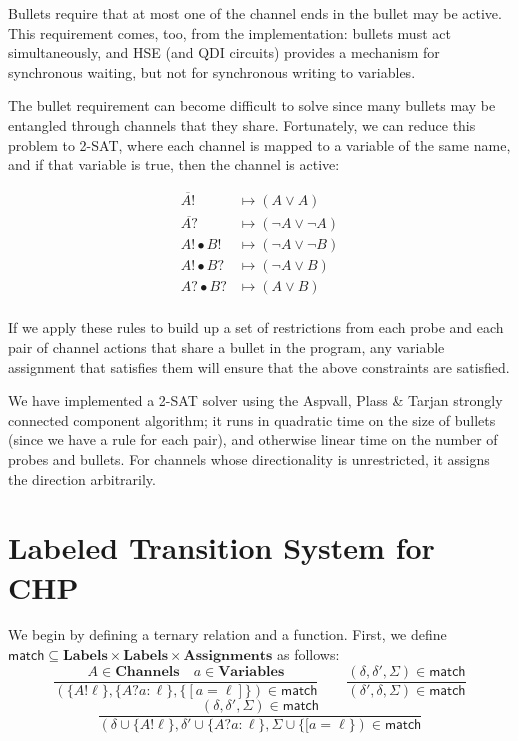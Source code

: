 \documentclass[times, 10pt]{article}
\begin{document}
Bullets require that at most one of the channel ends in the bullet may be
active.  This requirement comes, too, from the implementation:  bullets must act
simultaneously, and HSE (and QDI circuits) provides a mechanism for synchronous
waiting, but not for synchronous writing to variables.

The bullet requirement can become difficult to solve since many bullets may be
entangled through channels that they share.  Fortunately, we can reduce this
problem to 2-SAT, where each channel is mapped to a variable of the same name,
and if that variable is true, then the channel is active:

\begin{align*}
\overline{A!} & \mapsto (A \lor A) \\
\overline{A?} & \mapsto (\lnot A \lor \lnot A) \\
A! \bullet B! & \mapsto (\lnot A \lor \lnot B) \\
A! \bullet B? & \mapsto (\lnot A \lor B) \\
A? \bullet B? & \mapsto (A \lor B) \\
\end{align*}

If we apply these rules to build up a set of restrictions from each probe and
each pair of channel actions that share a bullet in the program, any variable
assignment that satisfies them will ensure that the above constraints are
satisfied.

We have implemented a 2-SAT solver using the Aspvall, Plass \& Tarjan strongly
connected component algorithm; it runs in quadratic time on the size of bullets
(since we have a rule for each pair), and otherwise linear time on the number of
probes and bullets.  For channels whose directionality is unrestricted, it
assigns the direction arbitrarily.

\section{Labeled Transition System for CHP}
We begin by defining a ternary relation and a function. First, we define
$\mathsf{match} \subseteq \mathbf{Labels} \times \mathbf{Labels} \times
\mathbf{Assignments}$ as follows:
$$
    \frac{A \in \mathbf{Channels} \quad a \in \mathbf{Variables}}{(\{A!\ell\}, \{A?a : \ell\}, \{[a = \ell]\}) \in \mathsf{match}} \qquad
    \frac{(\delta, \delta', \Sigma) \in \mathsf{match}}{(\delta', \delta, \Sigma) \in \mathsf{match}} $$$$
    \frac{(\delta, \delta', \Sigma) \in \mathsf{match}}{(\delta \cup \{A!\ell\}, \delta' \cup \{A?a : \ell\}, \Sigma \cup \{[a = \ell\}) \in \mathsf{match}}
$$
\end{document}
